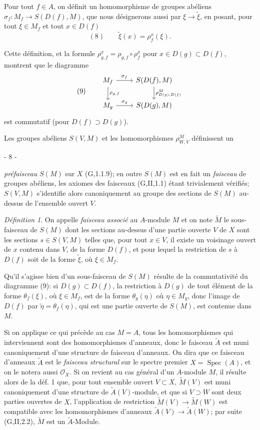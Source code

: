 Pour tout $f \in A$, on définit un homomorphisme de groupes abéliens $\sigma_f : M_f \to S(D(f),M)$, que nous désignerons aussi par $\xi \to \tilde{\xi}$, en posant, pour tout $\xi \in M_f$ et tout $x \in D(f)$
$$(8) \qquad \tilde{\xi}(x) = \rho_f^x(\xi).$$

Cette définition, et la formule $\rho_{g,f}^x = \rho_{g,f} \circ \rho_f^x$ pour $x \in D(g) \subset D(f)$, montrent que le diagramme
$$(9) \qquad \begin{tikzcd} M_f \arrow[r, "\sigma_f"] \arrow[d, "\rho_{g,f}"] & S(D(f),M) \arrow[d, "\rho_{D(g),D(f)}^M"] \\ M_g \arrow[r, "\sigma_g"] & S(D(g),M) \end{tikzcd}$$
est commutatif (pour $D(f) \supset D(g)$).

Les groupes abéliens $S(V,M)$ et les homomorphismes $\rho_{W,V}^M$ définissent un

\newpage


- 8 -

\emph{préfaisceau} $S(M)$ sur $X$ (G,1.1.9); en outre $S(M)$ est en fait un \emph{faisceau} de groupes abéliens, les axiomes des faisceaux (G,II,1.1) étant trivialement vérifiés; $S(V,M)$ s'identifie alors canoniquement au groupe des sections de $S(M)$ au-dessus de l'ensemble ouvert $V$.

\emph{Définition 1}. On appelle \emph{faisceau associé} au $A$-module $M$ et on note $\tilde{M}$ le sous-faisceau de $S(M)$ dont les sections au-dessus d'une partie ouverte $V$ de $X$ sont les sections $s \in S(V,M)$ telles que, pour tout $x \in V$, il existe un voisinage ouvert de $x$ contenu dans $V$, de la forme $D(f)$, et pour lequel la restriction de $s$ à $D(f)$ soit de la forme $\tilde{\xi}$, où $\xi \in M_f$.

Qu'il s'agisse bien d'un sous-faisceau de $S(M)$ résulte de la commutativité du diagramme (9): si $D(g) \subset D(f)$, la restriction à $D(g)$ de tout élément de la forme $\theta_f(\xi)$, où $\xi \in M_f$, est de la forme $\theta_g(\eta)$ où $\eta \in M_g$, donc l'image de $D(f)$ par $\tilde{\eta} = \theta_f(\eta)$, qui est une partie ouverte de $S(M)$, est contenue dans $M$.

Si on applique ce qui précède au cas $M = A$, tous les homomorphismes qui interviennent sont des homomorphismes d'anneaux, donc le faisceau $\tilde{A}$ est muni canoniquement d'une structure de faisceau d'anneaux. On dira que ce faisceau d'anneaux $\tilde{A}$ est le \emph{faisceau structural} sur le spectre premier $X = \operatorname{Spec}(A)$, et on le notera aussi $\mathcal{O}_X$. Si on revient au cas général d'un $A$-module $M$, il résulte alors de la déf. 1 que, pour tout ensemble ouvert $V \subset X$, $\tilde{M}(V)$ est muni canoniquement d'une structure de $\tilde{A}(V)$-module, et que si $V \supset W$ sont deux parties ouvertes de $X$, l'application de restriction $\tilde{M}(V) \to \tilde{M}(W)$ est compatible avec les homomorphismes d'anneaux $\tilde{A}(V) \to \tilde{A}(W)$; par suite (G,II,2.2), $\tilde{M}$ est un $\tilde{A}$-Module.

